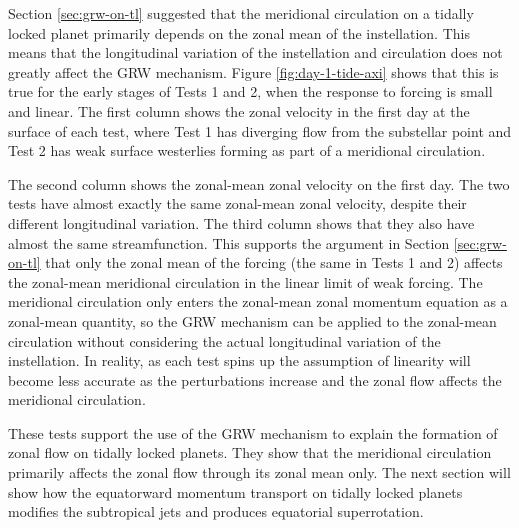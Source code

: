 Section \ref{sec:grw-on-tl} suggested that the meridional circulation on a tidally locked planet primarily depends on the zonal mean of the instellation. This means that the longitudinal variation of the instellation and circulation does not greatly affect the GRW mechanism. Figure \ref{fig:day-1-tide-axi} shows that this is true for the early stages of Tests 1 and 2, when the response to forcing is small and linear. The first column shows the zonal velocity in the first day at the surface of each test, where Test 1 has diverging flow from the substellar point and Test 2 has weak surface westerlies forming as part of a meridional circulation.

The second column shows the zonal-mean zonal velocity on the first day. The two tests have almost exactly the same zonal-mean zonal velocity, despite their different longitudinal variation. The third column shows that they also have almost the same streamfunction. This supports the argument in Section \ref{sec:grw-on-tl} that only the zonal mean of the forcing (the same in Tests 1 and 2) affects the zonal-mean meridional circulation in the linear limit of weak forcing. The meridional circulation only enters the zonal-mean zonal momentum equation \citep{showman2011superrotation} as a zonal-mean quantity, so the GRW mechanism can be applied to the zonal-mean circulation without considering the actual longitudinal variation of the instellation. In reality, as each test spins up the assumption of linearity will become less accurate as the perturbations increase and the zonal flow affects the meridional circulation.

These tests support the use of the GRW mechanism to explain the formation of zonal flow on tidally locked planets. They show that the meridional circulation primarily affects the zonal flow through its zonal mean only. The next section will show how the equatorward momentum transport on tidally locked planets modifies the subtropical jets and produces equatorial superrotation.



%
%


